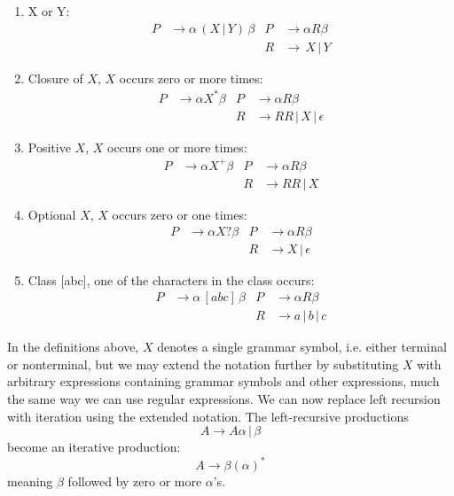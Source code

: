 \documentclass[a4paper,oneside,11pt]{book}
\theoremstyle{definition}
\begin{document}
\begin{enumerate}
\item X or Y:
\begin{align*}
P &\rightarrow \alpha\, (X\,|\,Y)\, \beta & P &\rightarrow \alpha R \beta\\
  &                             & R & \rightarrow \, X \, | \, Y
\end{align*}
\item Closure of $X$, $X$ occurs zero or more times:
\begin{align*}
P &\rightarrow \alpha X^* \beta & P &\rightarrow \alpha R \beta\\
  &                             & R & \rightarrow RR\, | \, X \, | \, \epsilon
\end{align*}
\item Positive $X$, $X$ occurs one or more times:
\begin{align*}
P &\rightarrow \alpha X^+ \beta & P &\rightarrow \alpha R \beta\\
  &                             & R & \rightarrow RR\, | \, X
\end{align*}
\item Optional $X$, $X$ occurs zero or one times:
\begin{align*}
P &\rightarrow \alpha X? \beta & P &\rightarrow \alpha R \beta\\
  &                            & R & \rightarrow X \,|\, \epsilon
\end{align*}
\item Class [abc], one of the characters in the class occurs:
\begin{align*}
P & \rightarrow \alpha \, [abc] \, \beta & P &\rightarrow \alpha R \beta\\
  &                            & R & \rightarrow a \,|\, b \, | \, c
\end{align*}
\end{enumerate}

In the definitions above, $X$ denotes a single grammar symbol, i.e. either terminal or nonterminal,
but we may extend the notation further by substituting $X$ with arbitrary expressions containing
grammar symbols and other expressions, much the same way we can use regular expressions.
We can now replace left recursion with iteration using the extended notation.
The left-recursive productions
$$A \rightarrow A\alpha \,|\, \beta$$
become an iterative production:
$$A \rightarrow \beta (\alpha)^*$$
meaning $\beta$ followed by zero or more $\alpha$'s.
\end{document}
